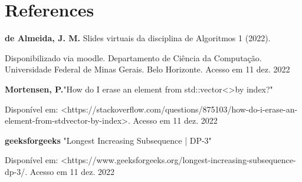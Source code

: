 \documentclass[12pt]{article}
\begin{document}
\section*{References}

    \par \textbf{de Almeida, J. M.} Slides virtuais da disciplina de Algoritmos 1 (2022).
    \par Disponibilizado via moodle. Departamento de Ciência da Computação. Universidade Federal de Minas Gerais. Belo Horizonte. Acesso em 11 dez. 2022
\par \textbf{Mortensen, P.}"How do I erase an element from std::vector\textless \textgreater by index?"
\par Disponível em: \textless https://stackoverflow.com/questions/875103/how-do-i-erase-an-element-from-stdvector-by-index\textgreater. Acesso em 11 dez. 2022
\par \textbf{geeksforgeeks} "Longest Increasing Subsequence | DP-3"
\par Disponível em: \textless https://www.geeksforgeeks.org/longest-increasing-subsequence-dp-3/. Acesso em 11 dez. 2022
\end{document}
